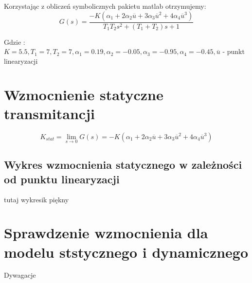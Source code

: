 \documentclass[a4paper, 11pt]{article}
\begin{document}
\noindent Korzystając z obliczeń symbolicznych pakietu matlab otrzymujemy: 
$$G(s) = \frac{-K(\alpha_1+2\alpha_2\overline{u}+3\alpha_3\overline{u}^2+4\alpha_4\overline{u}^3)}{T_1T_2s^2 + (T_1+T_2)s +1}$$

\noindent Gdzie : \\

$K  = 5.5, T_1 = 7, T_2 = 7, \alpha_1 = 0.19, \alpha_2 = -0.05, \alpha_3 = -0.95, \alpha_4 = -0.45,\overline{u}$ - punkt linearyzacji 
\\

\section{Wzmocnienie statyczne transmitancji}
$$K_{stat} = \lim_{s \rightarrow 0} G(s) = -K(\alpha_1+2\alpha_2\overline{u}+3\alpha_3\overline{u}^2+4\alpha_4\overline{u}^3)$$
\subsection{Wykres wzmocnienia statycznego w zależności od punktu linearyzacji}
tutaj wykresik piękny

\section{Sprawdzenie wzmocnienia dla modelu ststycznego i dynamicznego}
Dywagacje 
\end{document}
